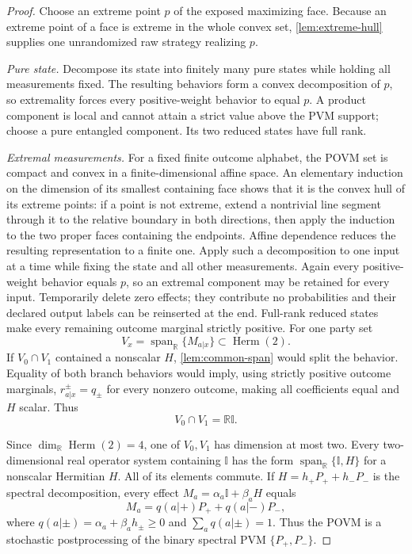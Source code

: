\documentclass[11pt]{article}
\theoremstyle{definition}
\newcommand{\Herm}{\operatorname{Herm}}
\newcommand{\id}{\mathbb I}
\newcommand{\R}{\mathbb R}
\begin{document}
\begin{proof}
Choose an extreme point \(p\) of the exposed maximizing face. Because an
extreme point of a face is extreme in the whole convex set,
\cref{lem:extreme-hull} supplies one unrandomized raw strategy realizing
\(p\).

\emph{Pure state.} Decompose its state into finitely many pure states while
holding all measurements fixed. The resulting behaviors form a convex
decomposition of \(p\), so extremality forces every positive-weight behavior
to equal \(p\). A product component is local and cannot attain a strict value
above the PVM support; choose a pure entangled component. Its two reduced
states have full rank.

\emph{Extremal measurements.} For a fixed finite outcome alphabet, the POVM
set is compact and convex in a finite-dimensional affine space. An elementary
induction on the dimension of its smallest containing face shows that it is
the convex hull of its extreme points: if a point is not extreme, extend a
nontrivial line segment through it to the relative boundary in both
directions, then apply the induction to the two proper faces containing the
endpoints. Affine dependence reduces the resulting representation to a
finite one. Apply such a decomposition to one input at a time while fixing
the state and all other measurements. Again every positive-weight behavior
equals \(p\), so an extremal component may be retained for every input.
Temporarily delete zero effects; they contribute no probabilities and their
declared output labels can be reinserted at the end. Full-rank reduced states
make every remaining outcome marginal strictly positive.
For one party set
\[
V_x=\operatorname{span}_{\R}\{M_{a|x}\}\subset\Herm(2).
\]
If \(V_0\cap V_1\) contained a nonscalar \(H\), \cref{lem:common-span} would
split the behavior. Equality of both branch behaviors would imply, using
strictly positive outcome marginals,
\(r^\pm_{a|x}=q_\pm\) for every nonzero outcome, making all coefficients
equal and \(H\) scalar. Thus
\[
V_0\cap V_1=\R\id.
\]

Since \(\dim_{\R}\Herm(2)=4\), one of \(V_0,V_1\) has dimension at most two.
Every two-dimensional real operator system containing \(\id\) has the form
\(\operatorname{span}_{\R}\{\id,H\}\) for a nonscalar Hermitian \(H\).
All of its elements commute. If
\(H=h_+P_++h_-P_-\) is the spectral decomposition, every effect
\(M_a=\alpha_a\id+\beta_aH\) equals
\[
M_a=q(a|+)P_++q(a|-)P_-,
\]
where \(q(a|\pm)=\alpha_a+\beta_a h_\pm\ge0\) and
\(\sum_aq(a|\pm)=1\). Thus the POVM is a stochastic postprocessing of the
binary spectral PVM \(\{P_+,P_-\}\).


\end{proof}
\end{document}
